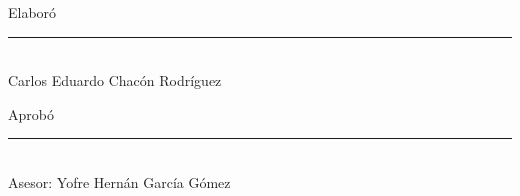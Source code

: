 \newpage
\thispagestyle{empty}
\centering
\vspace*{4cm}

Elaboró\\[0.8cm]
\rule{8cm}{0.4pt}\\
Carlos Eduardo Chacón Rodríguez %

\vspace{7cm}

Aprobó\\[0.8cm]
\rule{8cm}{0.4pt} \\[0.3cm]
Asesor: Yofre Hernán García Gómez  %